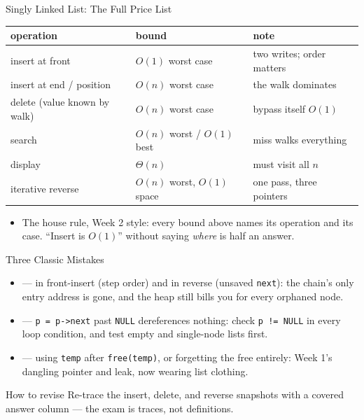 \documentclass[aspectratio=169]{beamer}
\begin{document}
\begin{frame}{Singly Linked List: The Full Price List}
  \begin{center}
  {\footnotesize
  \begin{tabular}{lll}
    \toprule
    \textbf{operation} & \textbf{bound} & \textbf{note} \\
    \midrule
    insert at front & $O(1)$ worst case & two writes; order matters \\
    insert at end / position & $O(n)$ worst case & the walk dominates \\
    delete (value known by walk) & $O(n)$ worst case & bypass itself $O(1)$ \\
    search & $O(n)$ worst / $O(1)$ best & miss walks everything \\
    display & $\Theta(n)$ & must visit all $n$ \\
    iterative reverse & $O(n)$ worst, $O(1)$ space & one pass, three pointers \\
    \bottomrule
  \end{tabular}}
  \end{center}
  \begin{itemize}
    \item The house rule, Week 2 style: every bound above names its operation
      and its case. ``Insert is $O(1)$'' without saying \emph{where} is half
      an answer.
  \end{itemize}
\end{frame}

\begin{frame}{Three Classic Mistakes}
  \begin{itemize}
    \item {} --- in front-insert
      (step order) and in reverse (unsaved \texttt{next}): the chain's only
      entry address is gone, and the heap still bills you for every orphaned
      node.
    \item {} --- \texttt{p = p->next} past
      \texttt{NULL} dereferences nothing: check \texttt{p != NULL} in every
      loop condition, and test empty and single-node lists first.
    \item {} --- using \texttt{temp} after
      \texttt{free(temp)}, or forgetting the free entirely: Week 1's
      dangling pointer and leak, now wearing list clothing.
  \end{itemize}
  \begin{exampleblock}{How to revise}
    Re-trace the insert, delete, and reverse snapshots with a covered answer
    column --- the exam is traces, not definitions.
  \end{exampleblock}
\end{frame}
\end{document}
